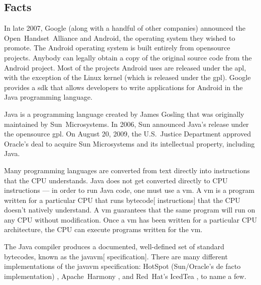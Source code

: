 \documentclass[11pt]{article}
\begin{document}
\begin{multicols}{2}

\section{Facts} %
\label{sec:facts}

In late 2007, Google (along with a handful of other companies) announced the
Open~Handset~Alliance \cite{open-handset-alliance-ann} and Android, the
operating system they wished to promote.  The Android operating system is built
entirely from \gls{opensource} projects.  Anybody can legally obtain a copy of
the original source code from the Android project.  Most of the projects Android
uses are released under the \gls{apl}, with the exception of the Linux kernel
(which is released under the \gls{gpl}).  Google provides a \gls{sdk} that
allows developers to write applications for Android in the Java programming
language. \cite{android-sdk-building}

Java is a programming language created by James Gosling that was originally
maintained by Sun~Microsystems.  In 2006, Sun announced Java's release under the
\gls{opensource} \gls{gpl}. \cite{sun-open-sources-java} On August 20, 2009, the
U.S.~Justice Department approved Oracle's deal to acquire Sun Microsystems and
its intellectual property, including Java. \cite{oracle-buys-sun}

Many programming languages are converted from text directly into instructions
that the CPU understands.  Java does not get converted directly to CPU
instructions --- in order to run Java code, one must use a \gls{vm}.
\cite[Chapter 1]{javavm-bytecode}  A \gls{vm} is a program written for a
particular CPU that runs \gls{bytecode}[ instructions] that the CPU doesn't
natively understand.  A \gls{vm} guarantees that the same program will run on
any CPU without modification.  Once a \gls{vm} has been written for a particular
CPU architecture, the CPU can execute programs written for the \gls{vm}.

The Java compiler produces a documented, well-defined set of standard
\glspl{bytecode}, known as the \gls{javavm}[ specification]. \cite[Chapter
4]{javavm-bytecode}  There are many different implementations of the
\gls{javavm} specification: HotSpot (Sun/Oracle's de facto implementation)
\cite{hotspot}, Apache~Harmony \cite{apache-harmony}, and Red~Hat's IcedTea
\cite{icedtea}, to name a few.


\end{multicols}
\end{document}
